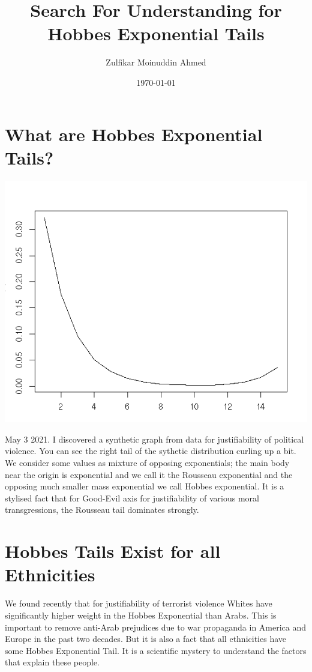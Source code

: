 \documentclass{amsart}
\title{Search For Understanding for Hobbes Exponential Tails}
\author{Zulfikar Moinuddin Ahmed}
\date{\today}
\begin{document}
\maketitle

\section{What are Hobbes Exponential Tails?}

\includegraphics[scale=0.8]{synthterror.jpeg}

May 3 2021.  I discovered a synthetic graph from data for justifiability of political violence.  You can see the right tail of the sythetic distribution curling up a bit.  We consider some values as mixture of opposing exponentials; the main body near the origin is exponential and we call it the Rousseau exponential and the opposing much smaller mass exponential we call Hobbes exponential.  It is a stylised fact that for Good-Evil axis for justifiability of various moral transgressions, the Rousseau tail dominates strongly.

\section{Hobbes Tails Exist for all Ethnicities}

We found recently that for justifiability of terrorist violence Whites have significantly higher weight in the Hobbes Exponential than Arabs.  This is important to remove anti-Arab prejudices due to war propaganda in America and Europe in the past two decades.  But it is also a fact that all ethnicities have some Hobbes Exponential Tail.  It is a scientific mystery to understand the factors that explain these people.
\end{document}
